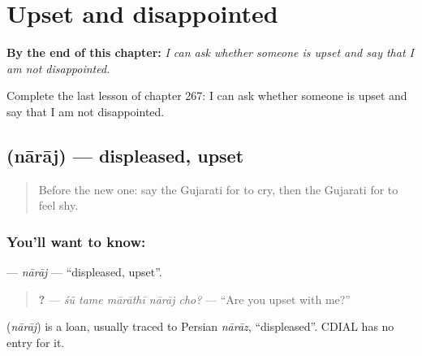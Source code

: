 
\chapter{Upset and disappointed}
\label{ch:gu-upset-and-disappointed}

\begin{chapteropening}
\textbf{By the end of this chapter:} \emph{I can ask whether someone is upset and say that I am not disappointed.}

Complete the last lesson of chapter 267: I can ask whether someone is upset and say that I am not disappointed.
\end{chapteropening}

\section[\texorpdfstring{\gu{નારાજ} (nārāj)}{નારાજ (nārāj)}]{ (nārāj) — displeased, upset}

\label{lesson:GU-C267-naraj}



\begin{quote}
Before the new one: say the Gujarati for to cry, then the Gujarati for to feel shy.
\end{quote}

\subsection*{You'll want to know: }
\textbf{} — \emph{nārāj} — \textquotedblleft{}displeased, upset\textquotedblright{}.

\begin{quote}
\textbf{    ?} — \emph{śũ tame mārāthī nārāj cho?} — \textquotedblleft{}Are you upset with me?\textquotedblright{}
\end{quote}

\begin{cousinweb}
\textbf{} (\emph{nārāj}) is a loan, usually traced to Persian \emph{nārāz}, \textquotedblleft{}displeased\textquotedblright{}. CDIAL has no entry for it.
\end{cousinweb}

